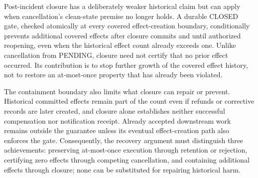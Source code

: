 \documentclass[11pt]{article}
\begin{document}
Post-incident closure has a deliberately weaker historical claim but can apply when cancellation\textquoteright{}s clean-state premise no longer holds. A durable CLOSED gate, checked atomically at every covered effect-creation boundary, conditionally prevents additional covered effects after closure commits and until authorized reopening, even when the historical effect count already exceeds one. Unlike cancellation from PENDING, closure need not certify that no prior effect occurred. Its contribution is to stop further growth of the covered effect history, not to restore an at-most-once property that has already been violated.

The containment boundary also limits what closure can repair or prevent. Historical committed effects remain part of the count even if refunds or corrective records are later created, and closure alone establishes neither successful compensation nor notification receipt. Already accepted downstream work remains outside the guarantee unless its eventual effect-creation path also enforces the gate. Consequently, the recovery argument must distinguish three achievements: preserving at-most-once execution through retention or rejection, certifying zero effects through competing cancellation, and containing additional effects through closure; none can be substituted for repairing historical harm.
\end{document}
